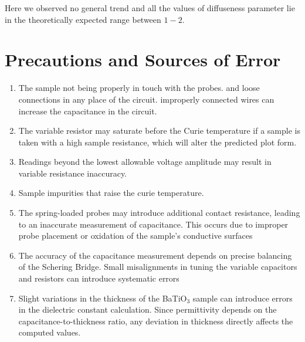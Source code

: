 Here we observed no general trend and all the values of diffuseness parameter lie in the theoretically expected range between $1-2$.

\section{Precautions and Sources of Error}

\begin{enumerate}
    \item The sample not being properly in touch with the probes. and loose connections in any place of the circuit. improperly connected wires can increase the capacitance in the circuit.
    \item The variable resistor may saturate before the Curie temperature if a sample is taken with a high sample resistance, which will alter the predicted plot form.
    \item Readings beyond the lowest allowable voltage amplitude may result in variable resistance inaccuracy.
    \item Sample impurities that raise the curie temperature.
    \item The spring-loaded
    probes may introduce additional contact resistance, leading to an inaccurate measurement of capacitance. This occurs due to improper probe placement or oxidation of the
    sample’s conductive surfaces
    \item The accuracy of the capacitance measurement depends on precise balancing of the Schering
    Bridge.
    Small misalignments in tuning the
    variable capacitors and resistors can introduce
    systematic errors
    \item Slight variations
    in the thickness of the BaTiO$_3$ sample can introduce errors in the dielectric constant calculation.
    Since permittivity depends on the
    capacitance-to-thickness ratio, any deviation
    in thickness directly affects the computed values.
\end{enumerate}